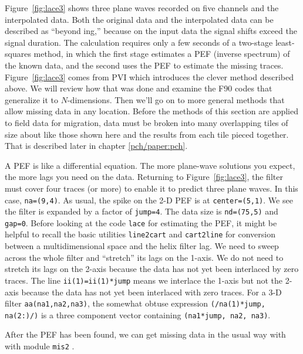 
\par
Figure~\ref{fig:lace3} shows three plane waves recorded on five channels
and the interpolated data.
Both the original data and the interpolated data can be described
as ``beyond ing,'' because on the input data
the signal shifts exceed the signal duration.
The calculation requires only a few seconds
of a two-stage least-squares method, in which the first stage
estimates a PEF (inverse spectrum) of the known data,
and the second uses the PEF to estimate the missing traces.
Figure~\ref{fig:lace3} comes from PVI
which introduces the clever method described above.
We will review how that was done and examine the F90 codes
that generalize it to $N$-dimensions.
Then we'll go on to more general methods
that allow missing data in any location.
Before the methods of this section
are applied to field data for migration,
data must be broken into many overlapping tiles
of size about like those shown here
and the results from each tile pieced together.
That is described later in chapter \ref{pch/paper:pch}.
\par
A PEF is like a differential equation.
The more plane-wave solutions you expect,
the more lags you need on the data.
Returning to Figure~\ref{fig:lace3},
the filter must cover four traces (or more)
to enable it to predict three plane waves.
In this case,
\texttt{na=(9,4)}.
As usual, the spike on the 2-D PEF is at
\texttt{center=(5,1)}.
We see the filter is expanded by a factor of
\texttt{jump=4}.
The data size is
\texttt{nd=(75,5)}
and \texttt{gap=0}.
Before looking at the code
\texttt{lace} 
for estimating the PEF,
it might be helpful to recall the basic utilities
\texttt{line2cart} and
\texttt{cart2line}
for conversion between a multidimensional space and
the helix filter lag.
We need to sweep across the whole filter
and ``stretch'' its lags on the 1-axis.
We do not need to stretch its lags on the 2-axis
because the data has not yet been interlaced by zero traces.
The line \texttt{ii(1)=ii(1)*jump}
means we interlace the 1-axis but not the 2-axis because
the data has not yet been interlaced with zero traces.
For a 3-D filter
\texttt{aa(na1,na2,na3)},
the somewhat obtuse expression
\texttt{(/na(1)*jump, na(2:)/)}
is a three component
vector containing
\texttt{(na1*jump, na2, na3)}.
\par
After the PEF has been found, we can get missing data in
the usual way with with module
\texttt{mis2} .


